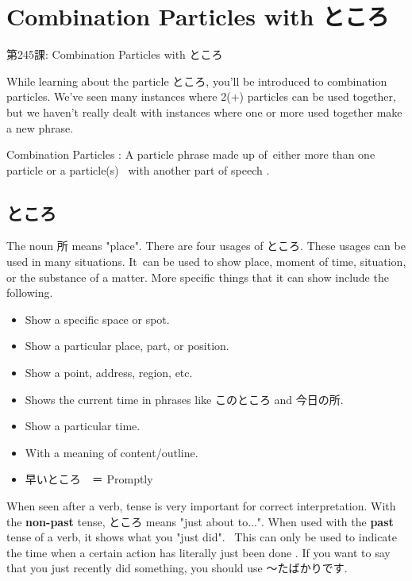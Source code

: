     
\chapter{Combination Particles with ところ}

\begin{center}
\begin{Large}
第245課: Combination Particles with ところ 
\end{Large}
\end{center}
 
\par{ While learning about the particle ところ, you'll be introduced to combination particles. We've seen many instances where 2(+) particles can be used together, but we haven't really dealt with instances where one or more used together make a new phrase. }

\par{Combination Particles : A particle phrase made up of either more than one particle or a particle(s)  with another part of speech . }
      
\section{ところ}
 
\par{ The noun 所 means "place". There are four usages of ところ. These usages can be used in many situations. It can be used to show place, moment of time, situation, or the substance of a matter. More specific things that it can show include the following. }

\begin{itemize}

\item Show a specific space or spot. 
\item Show a particular place, part, or position. 
\item Show a point, address, region, etc. 
\item Shows the current time in phrases like このところ and 今日の所. 
\item Show a particular time. 
\item With a meaning of content\slash outline. 
\item 早いところ　＝ Promptly 
\end{itemize}

\par{ When seen after a verb, tense is very important for correct interpretation. With the \textbf{non-past }tense, ところ means "just about to\dothyp{}\dothyp{}\dothyp{}". When used with the \textbf{past }tense of a verb, it shows what you "just did".  This can only be used to indicate the time when a certain action has literally just been done . If you want to say that you just recently did something, you should use ～たばかりです. }

